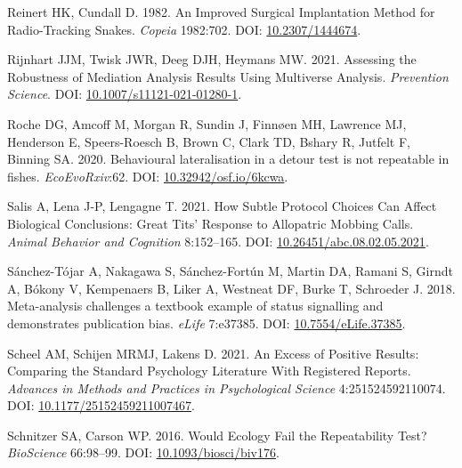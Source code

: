 \documentclass[10pt,a4paper]{article}
\newlength{\cslhangindent}
\newlength{\cslentryspacingunit} %
\newenvironment{CSLReferences}[2] %
 {%
  \setlength{\parindent}{0pt}
  \ifodd #1
  \let\oldpar\par
  \def\par{\hangindent=\cslhangindent\oldpar}
  \fi
  \setlength{\parskip}{#2\cslentryspacingunit}
 }%
 {}
\begin{document}
\begin{CSLReferences}{1}{0}
\leavevmode{}%
Reinert HK, Cundall D. 1982. An {Improved} {Surgical} {Implantation} {Method} for {Radio}-{Tracking} {Snakes}. \emph{Copeia} 1982:702. DOI: \href{https://doi.org/10.2307/1444674}{10.2307/1444674}.

\leavevmode{}%
Rijnhart JJM, Twisk JWR, Deeg DJH, Heymans MW. 2021. Assessing the {Robustness} of {Mediation} {Analysis} {Results} {Using} {Multiverse} {Analysis}. \emph{Prevention Science}. DOI: \href{https://doi.org/10.1007/s11121-021-01280-1}{10.1007/s11121-021-01280-1}.

\leavevmode{}%
Roche DG, Amcoff M, Morgan R, Sundin J, Finnøen MH, Lawrence MJ, Henderson E, Speers-Roesch B, Brown C, Clark TD, Bshary R, Jutfelt F, Binning SA. 2020. Behavioural lateralisation in a detour test is not repeatable in fishes. \emph{EcoEvoRxiv}:62. DOI: \href{https://doi.org/10.32942/osf.io/6kcwa}{10.32942/osf.io/6kcwa}.

\leavevmode{}%
Salis A, Lena J-P, Lengagne T. 2021. How {Subtle} {Protocol} {Choices} {Can} {Affect} {Biological} {Conclusions}: {Great} {Tits}' {Response} to {Allopatric} {Mobbing} {Calls}. \emph{Animal Behavior and Cognition} 8:152--165. DOI: \href{https://doi.org/10.26451/abc.08.02.05.2021}{10.26451/abc.08.02.05.2021}.

\leavevmode{}%
Sánchez-Tójar A, Nakagawa S, Sánchez-Fortún M, Martin DA, Ramani S, Girndt A, Bókony V, Kempenaers B, Liker A, Westneat DF, Burke T, Schroeder J. 2018. Meta-analysis challenges a textbook example of status signalling and demonstrates publication bias. \emph{eLife} 7:e37385. DOI: \href{https://doi.org/10.7554/eLife.37385}{10.7554/eLife.37385}.

\leavevmode{}%
Scheel AM, Schijen MRMJ, Lakens D. 2021. An {Excess} of {Positive} {Results}: {Comparing} the {Standard} {Psychology} {Literature} {With} {Registered} {Reports}. \emph{Advances in Methods and Practices in Psychological Science} 4:251524592110074. DOI: \href{https://doi.org/10.1177/25152459211007467}{10.1177/25152459211007467}.

\leavevmode{}%
Schnitzer SA, Carson WP. 2016. Would {Ecology} {Fail} the {Repeatability} {Test}? \emph{BioScience} 66:98--99. DOI: \href{https://doi.org/10.1093/biosci/biv176}{10.1093/biosci/biv176}.


\end{CSLReferences}
\end{document}
